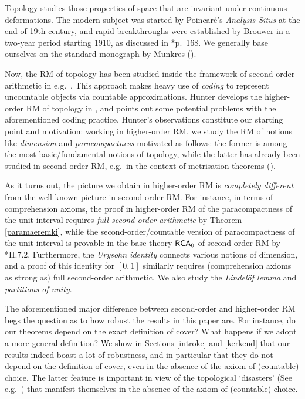 \documentclass[reqno]{amsart}
\def\RCA{\textup{\textsf{RCA}}}
\numberwithin{equation}{section}
\numberwithin{thm}{section}
\begin{document}
\smallskip

Topology studies those properties of space that are invariant under continuous deformations.
The modern subject was started by Poincar\'e's \emph{Analysis Situs} at the end of 19th century, 
and rapid breakthroughs were established by Brouwer in a two-year period starting 1910, as discussed in \cite{godsgeschenk}*{p.\ 168}. 
We generally base ourselves on the standard monograph by Munkres (\cite{munkies}).

\smallskip

Now, the RM of topology has been studied inside the framework of second-order arithmetic in e.g.\ \cite{mummymf, mummyphd, mummy}.
This approach makes heavy use of \emph{coding} to represent uncountable objects via countable approximations.  Hunter develops the higher-order RM of topology in \cite{hunterphd}, and points out some 
potential problems with the aforementioned coding practice.  Hunter's observations constitute our starting point and motivation: 
working in higher-order RM, we study the RM of notions like \emph{dimension} and \emph{paracompactness} motivated as follows: the former is among the most basic/fundamental notions of topology, while the latter has already been studied in second-order RM, e.g.\ in the context of metrisation theorems (\cite{simpson2, mummymf}). 

\smallskip

As it turns out, the picture we obtain in higher-order RM is \emph{completely different} from the well-known picture in second-order RM.  
For instance, in terms of comprehension axioms, the proof in higher-order RM of the paracompactness of the unit interval requires \emph{full second-order arithmetic} by Theorem \ref{paramaeremki}, 
while the second-order/countable version of paracompactness of the unit interval is provable in the base theory $\RCA_{0}$ of second-order RM by \cite{simpson2}*{II.7.2}. 
Furthermore, the \emph{Urysohn identity} connects various notions of dimension, and a proof of this identity {for $[0,1]$} similarly requires (comprehension axioms as strong as) full second-order arithmetic.  
We also study the \emph{Lindel\"of lemma} and \emph{partitions of unity}.

\smallskip

The aforementioned major difference between second-order and higher-order RM begs the question as to how robust the results in this paper are.  
For instance, do our theorems depend on the exact definition of cover?  What happens if we adopt a more general definition?  We show in Sections \ref{introke} and \ref{kerkend}
that our results indeed boast a lot of robustness, and in particular that they do not depend on the definition of cover, even in the absence of the axiom of (countable) choice. 
The latter feature is important in view of the topological `disasters' (See e.g.\ \cite{kermend}) that manifest themselves in the absence of the axiom of (countable) choice.  
\end{document}
